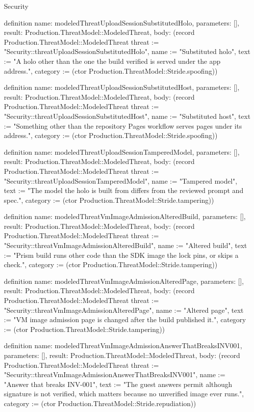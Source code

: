 \begin{lexlean}{Security}
\begin{semanticmodule}
definition{
  name: modeledThreatUploadSessionSubstitutedHolo,
  parameters: [],
  result: Production.ThreatModel::ModeledThreat,
  body: (record Production.ThreatModel::ModeledThreat {threat := "Security::threatUploadSessionSubstitutedHolo", name := "Substituted holo", text := "A holo other than the one the build verified is served under the app address.", category := (ctor Production.ThreatModel::Stride.spoofing)})
}

definition{
  name: modeledThreatUploadSessionSubstitutedHost,
  parameters: [],
  result: Production.ThreatModel::ModeledThreat,
  body: (record Production.ThreatModel::ModeledThreat {threat := "Security::threatUploadSessionSubstitutedHost", name := "Substituted host", text := "Something other than the repository Pages workflow serves pages under its address.", category := (ctor Production.ThreatModel::Stride.spoofing)})
}

definition{
  name: modeledThreatUploadSessionTamperedModel,
  parameters: [],
  result: Production.ThreatModel::ModeledThreat,
  body: (record Production.ThreatModel::ModeledThreat {threat := "Security::threatUploadSessionTamperedModel", name := "Tampered model", text := "The model the holo is built from differs from the reviewed prompt and spec.", category := (ctor Production.ThreatModel::Stride.tampering)})
}

definition{
  name: modeledThreatVmImageAdmissionAlteredBuild,
  parameters: [],
  result: Production.ThreatModel::ModeledThreat,
  body: (record Production.ThreatModel::ModeledThreat {threat := "Security::threatVmImageAdmissionAlteredBuild", name := "Altered build", text := "Prism build runs other code than the SDK image the lock pins, or skips a check.", category := (ctor Production.ThreatModel::Stride.tampering)})
}

definition{
  name: modeledThreatVmImageAdmissionAlteredPage,
  parameters: [],
  result: Production.ThreatModel::ModeledThreat,
  body: (record Production.ThreatModel::ModeledThreat {threat := "Security::threatVmImageAdmissionAlteredPage", name := "Altered page", text := "VM image admission page is changed after the build published it.", category := (ctor Production.ThreatModel::Stride.tampering)})
}

definition{
  name: modeledThreatVmImageAdmissionAnswerThatBreaksINV001,
  parameters: [],
  result: Production.ThreatModel::ModeledThreat,
  body: (record Production.ThreatModel::ModeledThreat {threat := "Security::threatVmImageAdmissionAnswerThatBreaksINV001", name := "Answer that breaks INV-001", text := "The guest answers permit although signature is not verified, which matters because no unverified image ever runs.", category := (ctor Production.ThreatModel::Stride.repudiation)})
}


\end{semanticmodule}
\end{lexlean}
